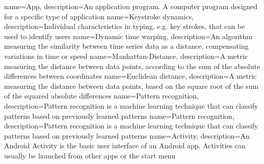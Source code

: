  {
  name=App,
  description={An application program. A computer program designed for a specific type of application}
}
 {
  name=Keystroke dynamics,
  description={Individual characteristics in typing, e.g. key strokes, that can be used to identify users}
}
 {
  name=Dynamic time warping,
  description={An algorithm measuring the similarity between time series data as a distance, compensating variations in time or speed}
}
 {
  name=Manhattan-Distance,
  description={A metric measuring the distance between data points, according to the sum of the absolute differences between coordinates}
}
 {
  name=Euclidean distance,
  description={A metric measuring the distance between data points, based on the square root of the sum of the squared absolute differences}
}
 {
  name=Pattern recognition,
  description={Pattern recognition is a machine learning technique that can classify patterns based on previously learned patterns}
}
 {
  name=Pattern recognition,
  description={Pattern recognition is a machine learning technique that can classify patterns based on previously learned patterns}
}
 {
  name=Activity,
  description={An Android Activity is the basic user interface of an Android \gls{app}. Activities can usually be launched from other \glspl{app} or the start menu}
}
